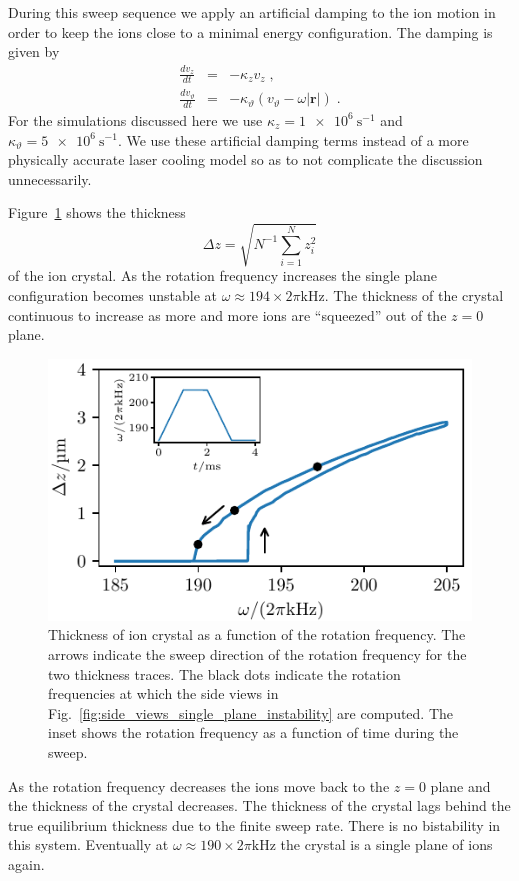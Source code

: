 \documentclass[aps, pra, preprint]{revtex4-1}
\begin{document}
During this sweep sequence we apply an artificial damping to the
ion motion in order to keep the ions close to a minimal energy
configuration. The damping is given by
\begin{eqnarray}
  \frac{dv_z}{dt}&=&-\kappa_z v_z\;,\\
  \frac{dv_\vartheta}{dt}&=&-\kappa_\vartheta\left( v_\vartheta -
                            \omega\left| \mathbf{r} \right| \right)\;.
\end{eqnarray}
For the simulations discussed here we use
$\kappa_z=\SI{1e6}{\second^{-1}}$ and
$\kappa_\vartheta=\SI{5e6}{\second^{-1}}$. We use these
artificial damping terms instead of a more physically accurate
laser cooling model so as to not complicate the discussion
unnecessarily.

Figure~\ref{fig:single_plane_instability} shows the thickness
\begin{equation}
  \Delta z=\sqrt{N^{-1}\sum_{i=1}^N z_i^2}
\end{equation}
of the ion crystal. As the rotation frequency increases the
single plane configuration becomes unstable at $\omega\approx
194\times 2\pi\si{\kilo\hertz}$. The thickness of the crystal
continuous to increase as more and more ions are ``squeezed'' out
of the $z=0$ plane.

\begin{figure}
  \includegraphics{./figures/fig_single_plane_instability.pdf}
  \caption{Thickness of ion crystal as a function of the rotation
    frequency. The arrows indicate the sweep direction of the
    rotation frequency for the two thickness traces. The black
    dots indicate the rotation frequencies at which the side
    views in Fig.~\ref{fig:side_views_single_plane_instability}
    are computed. The inset shows the rotation frequency as a
    function of time during the sweep.}
  \label{fig:single_plane_instability}
\end{figure}
As the rotation frequency decreases the ions move back to the
$z=0$ plane and the thickness of the crystal decreases. The
thickness of the crystal lags behind the true equilibrium
thickness due to the finite sweep rate. There is no bistability
in this system. Eventually at $\omega\approx 190\times
2\pi\si{\kilo\hertz}$ the crystal is a single plane of ions again.
\end{document}
